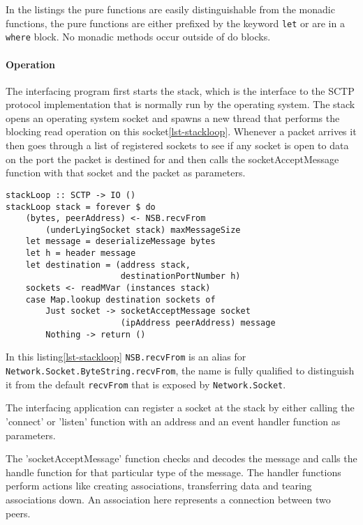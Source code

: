 In the listings the pure functions are easily distinguishable from the monadic functions, the pure functions are either prefixed by the keyword \lstinline{let} or are in a \lstinline{where} block. No monadic methods occur outside of do blocks.

\paragraph{Operation}
The interfacing program first starts the stack, which is the interface to the SCTP protocol implementation that is normally run by the operating system. The stack opens an operating system socket and spawns a new thread that performs the blocking read operation on this socket\ref{lst-stackloop}. Whenever a packet arrives it then goes through a list of registered sockets to see if any socket is open to data on the port the packet is destined for and then calls the socketAcceptMessage function with that socket and the packet as parameters.

\begin{lstlisting}[caption={The stack loop},label={lst-stackloop}]
stackLoop :: SCTP -> IO ()
stackLoop stack = forever $ do
    (bytes, peerAddress) <- NSB.recvFrom 
        (underLyingSocket stack) maxMessageSize
    let message = deserializeMessage bytes
    let h = header message
    let destination = (address stack,
                       destinationPortNumber h)
    sockets <- readMVar (instances stack)
    case Map.lookup destination sockets of
        Just socket -> socketAcceptMessage socket
                       (ipAddress peerAddress) message
        Nothing -> return ()
\end{lstlisting}

In this listing\ref{lst-stackloop} \lstinline{NSB.recvFrom} is an alias for \lstinline{Network.Socket.ByteString.recvFrom}, the name is fully qualified to distinguish it from the default \lstinline{recvFrom} that is exposed by \lstinline{Network.Socket}.

The interfacing application can register a socket at the stack by either calling the 'connect' or 'listen' function with an address and an event handler function as parameters.

The 'socketAcceptMessage' function checks and decodes the message and calls the handle function for that particular type of the message. The handler functions perform actions like creating associations, transferring data and tearing associations down. An association here represents a connection between two peers.


